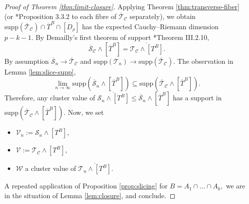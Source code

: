 \documentclass[11pt]{amsart}
\theoremstyle{definition}
\newcommand{\lto}{\longrightarrow}
\newcommand{\cC}{\mathcal{C}}
\newcommand{\sT}{\mathscr{T}}
\newcommand{\sS}{\mathscr{S}}
\newcommand{\sW}{\mathscr{W}}
\newcommand{\sV}{\mathscr{V}}
\newcommand{\supp}[1]{{\mathrm{supp}(#1)}}
\begin{document}
\begin{proof}[Proof of Theorem \ref{thm:limit-closure}]
 Applying Theorem \ref{thm:transverse-fiber} (or \cite{Osserman-Payne}*{Proposition 3.3.2} to each fibre of $\overline{\sT}_{\cC}$ separately), we obtain 
 $\supp{\overline{\sT}_{\cC}} \cap \overline{T}^B \cap [D_\rho]$ has the expected Cauchy--Riemann dimension $p-k-1.$ By Demailly's first theorem of support  \cite{DemaillyBook1}*{Theorem III.2.10},
 $$\overline{\sS}_{\cC} \wedge [\overline{T}^B] = \overline{\sT_{\cC} \wedge [T^B]}. $$ 
 By assumption $\overline{\sS}_n  \lto \overline{\sT}_{\cC}$ and $\supp{\sT_n}  \lto \supp{\overline{\sT}_{\cC}}.$ The observation in Lemma \ref{lem:slice-supp}, 
$$
 \lim_{n \to \infty} \supp{\overline{\sS}_n \wedge [\overline{T}^B]} \subseteq \supp{\overline{\sT}_{\cC} \wedge [\overline{T}^B]}.
$$
Therefore, any cluster value of $\overline{\sS_n \wedge [T^B]} \leq \overline{\sS}_n \wedge [\overline{T}^B] $ has a support in $\supp{\overline{\sT}_{\cC} \wedge [\overline{T}^B]}.$ Now, we set
\begin{itemize}
\item [(a)] $\sV_n := \sS_n \wedge [T^B],$
\item [(b)] $\sV := \sT_{\cC} \wedge [T^B],$
\item [(c)]  $\sW$ a cluster value of $\overline{\sT_n \wedge [{T}^B]}.$
\end{itemize}
A repeated application of Proposition \ref{prop:slicing} for $B = A_1 \cap \dots \cap A_k,$ we are in the situation of Lemma \ref{lem:closure}, and  conclude. 
\end{proof}

\end{document}
